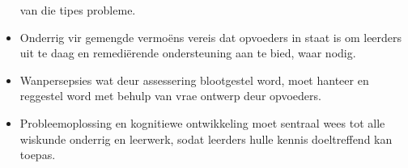 \begin{itemize}[noitemsep]
  van die tipes probleme.
\item
  Onderrig vir gemengde vermo\"{e}ns vereis dat opvoeders in staat is om
  leerders uit te daag en remedi\"{e}rende ondersteuning aan te bied, waar
  nodig.
\item
  Wanpersepsies wat deur assessering blootgestel word, moet hanteer
  en reggestel word met behulp van vrae ontwerp deur opvoeders.
\item
  Probleemoplossing en kognitiewe ontwikkeling moet sentraal wees tot
  alle wiskunde onderrig en leerwerk, sodat leerders hulle kennis
  doeltreffend kan toepas.
\end{itemize}

